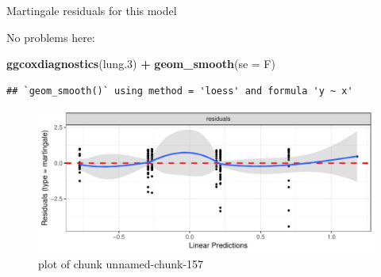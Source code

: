 \documentclass[ignorenonframetext,]{beamer}
\newenvironment{Shaded}{\begin{snugshade}}{\end{snugshade}}
\newcommand{\DataTypeTok}[1]{\textcolor[rgb]{0.13,0.29,0.53}{#1}}
\newcommand{\FloatTok}[1]{\textcolor[rgb]{0.00,0.00,0.81}{#1}}
\newcommand{\KeywordTok}[1]{\textcolor[rgb]{0.13,0.29,0.53}{\textbf{#1}}}
\newcommand{\NormalTok}[1]{#1}
\newcommand{\OperatorTok}[1]{\textcolor[rgb]{0.81,0.36,0.00}{\textbf{#1}}}
\newcommand{\StringTok}[1]{\textcolor[rgb]{0.31,0.60,0.02}{#1}}
\begin{document}
\begin{frame}[fragile]{Martingale residuals for this model}
\protect\hypertarget{martingale-residuals-for-this-model}{}

No problems here:

\begin{Shaded}
\begin{Highlighting}[]
\KeywordTok{ggcoxdiagnostics}\NormalTok{(lung}\FloatTok{.3}\NormalTok{) }\OperatorTok{+}\StringTok{ }\KeywordTok{geom_smooth}\NormalTok{(}\DataTypeTok{se =}\NormalTok{ F)}
\end{Highlighting}
\end{Shaded}

\begin{verbatim}
## `geom_smooth()` using method = 'loess' and formula 'y ~ x'
\end{verbatim}

\begin{figure}
\centering
\includegraphics{figure/unnamed-chunk-157-1.pdf}
\caption{plot of chunk unnamed-chunk-157}
\end{figure}

\end{frame}
\end{document}
